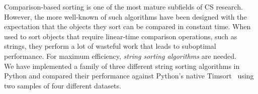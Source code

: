 \begin{multicols}{2}
\sffamily
\small 
Comparison-based sorting is one of the most mature subfields of CS research.
However, the more well-known of such algorithms have been designed with the
expectation that the objects they sort can be compared in constant time.
When used to sort objects that require linear-time comparison operations,
such as strings, they perform a lot of wasteful work that leads to suboptimal
performance. For maximum efficiency, \emph{string sorting algorithms} are
needed.\\

We have implemented a family of three different string sorting algorithms in
Python and compared their performance against Python's native Timsort~\cite{p2002} using two samples of four different datasets.\\
\end{multicols}
